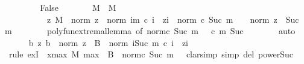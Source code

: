 \begin{isabellebody}
\ \ \isamarkupfalse%
\isanewline
\ \ \ \ \isamarkupfalse%
\ False\isanewline
\ \ \ \ \isamarkupfalse%
\ \isamarkupfalse%
\ M\ \ M{\isacharcolon}{\kern0pt}\isanewline
\ \ \ \ \ \ \ \ \ \ {\isachardoublequoteopen}{\isasymAnd}z{\isachardot}{\kern0pt}\ M\ {\isasymle}\ norm\ z\ {\isasymLongrightarrow}\ norm\ {\isacharparenleft}{\kern0pt}{\isasymSum}i{\isasymle}m{\isachardot}{\kern0pt}\ c\ i\ {\isacharasterisk}{\kern0pt}\ z{\isacharcircum}{\kern0pt}i{\isacharparenright}{\kern0pt}\ {\isasymle}\ norm\ {\isacharparenleft}{\kern0pt}c\ {\isacharparenleft}{\kern0pt}Suc\ m{\isacharparenright}{\kern0pt}{\isacharparenright}{\kern0pt}\ {\isacharslash}{\kern0pt}\ {}\ {\isacharasterisk}{\kern0pt}\ norm\ z\ {\isacharcircum}{\kern0pt}\ Suc\ m{\isachardoublequoteclose}\isanewline
\ \ \ \ \ \ \isamarkupfalse%
\ polyfun{\isacharunderscore}{\kern0pt}extremal{\isacharunderscore}{\kern0pt}lemma\ {\isacharbrackleft}{\kern0pt}of\ {\isachardoublequoteopen}norm{\isacharparenleft}{\kern0pt}c\ {\isacharparenleft}{\kern0pt}Suc\ m{\isacharparenright}{\kern0pt}{\isacharparenright}{\kern0pt}\ {\isacharslash}{\kern0pt}\ {}{\isachardoublequoteclose}\ c\ m{\isacharbrackright}{\kern0pt}\ Suc\isanewline
\ \ \ \ \ \ \isamarkupfalse%
\ auto\isanewline
\ \ \ \ \isamarkupfalse%
\ {\isachardoublequoteopen}{\isasymexists}b{\isachardot}{\kern0pt}\ {\isasymforall}z{\isachardot}{\kern0pt}\ b\ {\isasymle}\ norm\ z\ {\isasymlongrightarrow}\ B\ {\isasymle}\ norm\ {\isacharparenleft}{\kern0pt}{\isasymSum}i{\isasymle}Suc\ m{\isachardot}{\kern0pt}\ c\ i\ {\isacharasterisk}{\kern0pt}\ z{\isacharcircum}{\kern0pt}i{\isacharparenright}{\kern0pt}{\isachardoublequoteclose}\isanewline
\ \ \ \ \isamarkupfalse%
\ {\isacharparenleft}{\kern0pt}rule\ exI\ {\isacharbrackleft}{\kern0pt}\ x{\isacharequal}{\kern0pt}{\isachardoublequoteopen}max\ M\ {\isacharparenleft}{\kern0pt}max\ {}\ {\isacharparenleft}{\kern0pt}{\isasymbar}B{\isasymbar}\ {\isacharslash}{\kern0pt}\ {\isacharparenleft}{\kern0pt}norm{\isacharparenleft}{\kern0pt}c\ {\isacharparenleft}{\kern0pt}Suc\ m{\isacharparenright}{\kern0pt}{\isacharparenright}{\kern0pt}\ {\isacharslash}{\kern0pt}\ {}{\isacharparenright}{\kern0pt}{\isacharparenright}{\kern0pt}{\isacharparenright}{\kern0pt}{\isachardoublequoteclose}{\isacharbrackright}{\kern0pt}{\isacharcomma}{\kern0pt}\ clarsimp\ simp\ del{\isacharcolon}{\kern0pt}\ power{\isacharunderscore}{\kern0pt}Suc{\isacharparenright}{\kern0pt}\isanewline

\end{isabellebody}
